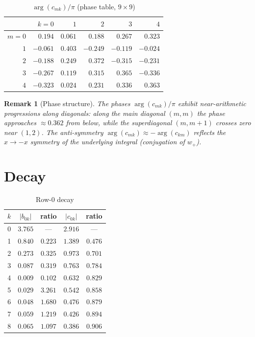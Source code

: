 \documentclass[11pt,a4paper]{article}
\newtheorem{remark}[proposition]{Remark}
\begin{document}
\begin{table}[ht]
\centering\small
\caption{$\arg(c_{mk})/\pi$ (phase table, $9 \times 9$)}
\begin{tabular}{r|rrrrr}
\toprule
& $k=0$ & $1$ & $2$ & $3$ & $4$ \\
\midrule
$m=0$ & $0.194$ & $0.061$ & $0.188$ & $0.267$ & $0.323$ \\
$1$   & $-0.061$ & $0.403$ & $-0.249$ & $-0.119$ & $-0.024$ \\
$2$   & $-0.188$ & $0.249$ & $0.372$ & $-0.315$ & $-0.231$ \\
$3$   & $-0.267$ & $0.119$ & $0.315$ & $0.365$ & $-0.336$ \\
$4$   & $-0.323$ & $0.024$ & $0.231$ & $0.336$ & $0.363$ \\
\bottomrule
\end{tabular}
\end{table}

\begin{remark}[Phase structure]
The phases $\arg(c_{mk})/\pi$ exhibit near-arithmetic
progressions along diagonals: along the main diagonal
$(m,m)$ the phase approaches $\approx 0.362$ from below,
while the superdiagonal $(m,m{+}1)$ crosses zero near
$(1,2)$.  The anti-symmetry $\arg(c_{mk}) \approx
-\arg(c_{km})$ reflects the $x \to -x$ symmetry of the
underlying integral (conjugation of $w_+$).
\end{remark}

\section{Decay}

\begin{table}[ht]
\centering\small
\caption{Row-$0$ decay}
\begin{tabular}{rcccc}
\toprule
$k$ & $|b_{0k}|$ & ratio & $|c_{0k}|$ & ratio \\
\midrule
0 & $3.765$ & --- & $2.916$ & --- \\
1 & $0.840$ & $0.223$ & $1.389$ & $0.476$ \\
2 & $0.273$ & $0.325$ & $0.973$ & $0.701$ \\
3 & $0.087$ & $0.319$ & $0.763$ & $0.784$ \\
4 & $0.009$ & $0.102$ & $0.632$ & $0.829$ \\
5 & $0.029$ & $3.261$ & $0.542$ & $0.858$ \\
6 & $0.048$ & $1.680$ & $0.476$ & $0.879$ \\
7 & $0.059$ & $1.219$ & $0.426$ & $0.894$ \\
8 & $0.065$ & $1.097$ & $0.386$ & $0.906$ \\
\bottomrule
\end{tabular}
\end{table}
\end{document}
